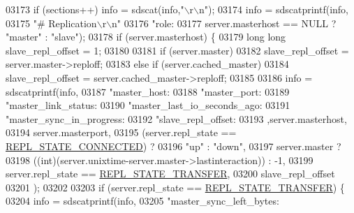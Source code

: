 \begin{DoxyCode}
{{{{{{{{{{{{{{{{{{{{{{{{{{{{{{{{{{{{{{{{{{{{{{{{{{{{{{{{{{{{{{{{{{{{{{{{{{{{{{{{{{{{{{{{{{{{{{{{{{{{{{{{{{{{{{{{{{{{{{{{{{{{{{{{{{{{{{{{{{03173         \textcolor{keywordflow}{if} (sections++) info = sdscat(info,\textcolor{stringliteral}{"\(\backslash\)r\(\backslash\)n"});
03174         info = sdscatprintf(info,
03175             \textcolor{stringliteral}{"# Replication\(\backslash\)r\(\backslash\)n"}
03176             \textcolor{stringliteral}{"role:%
03177             server.masterhost == NULL ? \textcolor{stringliteral}{"master"} : \textcolor{stringliteral}{"slave"});
03178         \textcolor{keywordflow}{if} (server.masterhost) \{
03179             \textcolor{keywordtype}{long} \textcolor{keywordtype}{long} slave\_repl\_offset = 1;
03180 
03181             \textcolor{keywordflow}{if} (server.master)
03182                 slave\_repl\_offset = server.master->reploff;
03183             \textcolor{keywordflow}{else} \textcolor{keywordflow}{if} (server.cached\_master)
03184                 slave\_repl\_offset = server.cached\_master->reploff;
03185 
03186             info = sdscatprintf(info,
03187                 \textcolor{stringliteral}{"master\_host:%
03188                 \textcolor{stringliteral}{"master\_port:%
03189                 \textcolor{stringliteral}{"master\_link\_status:%
03190                 \textcolor{stringliteral}{"master\_last\_io\_seconds\_ago:%
03191                 \textcolor{stringliteral}{"master\_sync\_in\_progress:%
03192                 \textcolor{stringliteral}{"slave\_repl\_offset:%
03193                 ,server.masterhost,
03194                 server.masterport,
03195                 (server.repl\_state == \hyperlink{server_8h_aed693b3a9cdfc05cf5ab7551a8c86fbe}{REPL\_STATE\_CONNECTED}) ?
03196                     \textcolor{stringliteral}{"up"} : \textcolor{stringliteral}{"down"},
03197                 server.master ?
03198                 ((\textcolor{keywordtype}{int})(server.unixtime-server.master->lastinteraction)) : -1,
03199                 server.repl\_state == \hyperlink{server_8h_a1d27594a2d9c8d24e4ed5a2e88d1113e}{REPL\_STATE\_TRANSFER},
03200                 slave\_repl\_offset
03201             );
03202 
03203             \textcolor{keywordflow}{if} (server.repl\_state == \hyperlink{server_8h_a1d27594a2d9c8d24e4ed5a2e88d1113e}{REPL\_STATE\_TRANSFER}) \{
03204                 info = sdscatprintf(info,
03205                     \textcolor{stringliteral}{"master\_sync\_left\_bytes:%
}}}}}}}}}}}}}}}}}}}}}}}}}}}}}}}}}}}}}}}}}}}}}}}}}}}}}}}}}}}}}}}}}}}}}}}}}}}}}}}}}}}}}}}}}}}}}}}}}}}}}}}}}}}}}}}}}}}}}}}}}}}}}}}}}}}}}}}}}}}}}}}}}}
\end{DoxyCode}
